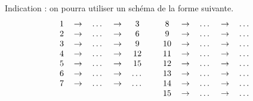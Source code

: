 \documentclass{exam}
\begin{document}
\begin{questions}
Indication : on pourra utiliser un schéma de la forme suivante.
\begin{equation*}
\begin{tabular}{ccccccccccc}
$1$&$\to$&$\dots$&$\to$&$3$&&$8$&$\to$&$\dots$&$\to$&$\dots$\\
$2$&$\to$&$\dots$&$\to$&$6$&&$9$&$\to$&$\dots$&$\to$&$\dots$\\
$3$&$\to$&$\dots$&$\to$&$9$&&$10$&$\to$&$\dots$&$\to$&$\dots$\\
$4$&$\to$&$\dots$&$\to$&$12$&&$11$&$\to$&$\dots$&$\to$&$\dots$\\
$5$&$\to$&$\dots$&$\to$&$15$&&$12$&$\to$&$\dots$&$\to$&$\dots$\\
$6$&$\to$&$\dots$&$\to$&$\dots$&&$13$&$\to$&$\dots$&$\to$&$\dots$\\
$7$&$\to$&$\dots$&$\to$&$\dots$&&$14$&$\to$&$\dots$&$\to$&$\dots$\\
&&&&&&$15$&$\to$&$\dots$&$\to$&$\dots$\\
    
\end{tabular}
\end{equation*}
\end{questions}
\end{document}
